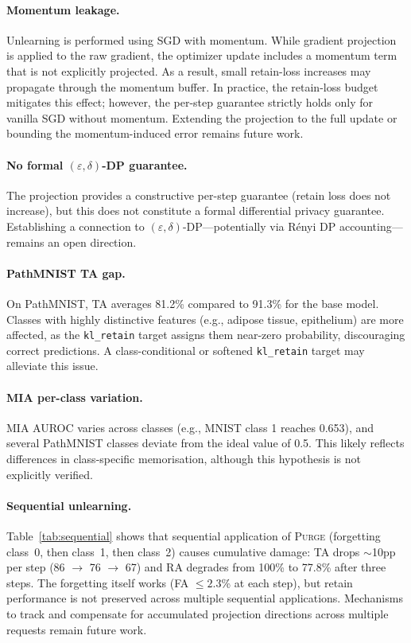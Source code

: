 \documentclass{article}
\newcommand{\ours}{\textsc{Purge}}
\newcommand{\klr}{\texttt{kl\_retain}}
\newcommand{\new}[1]{{\color{orange}#1}}
\begin{document}
\paragraph{Momentum leakage.}
Unlearning is performed using SGD with momentum.
While gradient projection is applied to the raw gradient, the optimizer update includes a momentum term that is not explicitly projected.
As a result, small retain-loss increases may propagate through the momentum buffer.
In practice, the retain-loss budget mitigates this effect; however, the per-step guarantee strictly holds only for vanilla SGD without momentum.
Extending the projection to the full update or bounding the momentum-induced error remains future work.

\paragraph{No formal $(\varepsilon, \delta)$-DP guarantee.}
The projection provides a constructive per-step guarantee (retain loss does not increase), but this does not constitute a formal differential privacy guarantee.
Establishing a connection to $(\varepsilon, \delta)$-DP---potentially via R\'enyi DP accounting---remains an open direction.

\paragraph{PathMNIST TA gap.}
On PathMNIST, TA averages 81.2\% compared to 91.3\% for the base model.
Classes with highly distinctive features (e.g., adipose tissue, epithelium) are more affected, as the \klr{} target assigns them near-zero probability, discouraging correct predictions.
A class-conditional or softened \klr{} target may alleviate this issue.

\paragraph{MIA per-class variation.}
MIA AUROC varies across classes (e.g., MNIST class 1 reaches 0.653), and several PathMNIST classes deviate from the ideal value of 0.5.
This likely reflects differences in class-specific memorisation, although this hypothesis is not explicitly verified.

\new{\paragraph{Sequential unlearning.}
Table~\ref{tab:sequential} shows that sequential application of \ours{} (forgetting class~0, then class~1, then class~2) causes cumulative damage: TA drops $\sim$10pp per step (86 $\to$ 76 $\to$ 67) and RA degrades from 100\% to 77.8\% after three steps. The forgetting itself works (FA $\le 2.3$\% at each step), but retain performance is not preserved across multiple sequential applications. Mechanisms to track and compensate for accumulated projection directions across multiple requests remain future work.}
\end{document}
